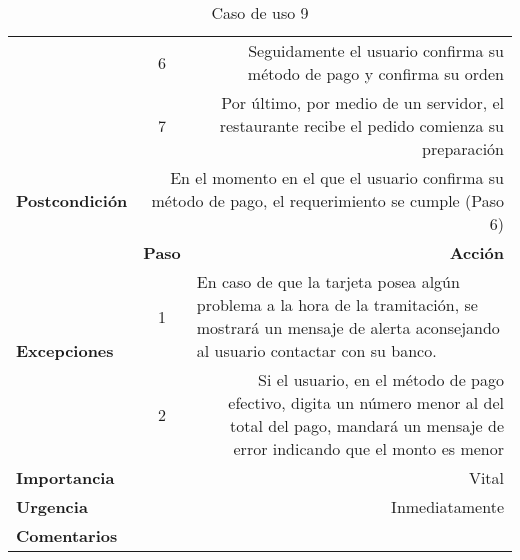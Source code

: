 \documentclass[conference]{IEEEtran}
\begin{document}
\begin{table}[H]
\begin{adjustbox}{width=0.47\textwidth}
\begin{tabular}{|p{11.215em}|r|r|}
\cmidrule{2-3}    \multicolumn{1}{|c|}{} & \multicolumn{1}{c|}{6} & \multicolumn{1}{p{32em}|}{Seguidamente el usuario confirma su método de pago y confirma su orden } \\
\cmidrule{2-3}    \multicolumn{1}{|c|}{} & \multicolumn{1}{c|}{7} & \multicolumn{1}{p{32em}|}{Por último, por medio de un servidor, el restaurante recibe el pedido comienza su preparación} \\
    \midrule
    \textbf{Postcondición} & \multicolumn{2}{p{37.355em}|}{En el momento en el que el usuario confirma su método de pago, el requerimiento se cumple (Paso 6)} \\
    \midrule
    \multirow{4}[6]{*}{\textbf{Excepciones}} & \multicolumn{1}{p{5.355em}|}{\textbf{Paso}} & \multicolumn{1}{p{32em}|}{\textbf{Acción}} \\
\cmidrule{2-3}    \multicolumn{1}{|c|}{} & \multicolumn{1}{c|}{\multirow{2}[2]{*}{1}} & \multicolumn{1}{l|}{\multirow{2}[2]{*}{En caso de que la tarjeta posea algún problema a la hora de la tramitación, se mostrará un mensaje de alerta aconsejando al usuario contactar con su banco. }} \\
    \multicolumn{1}{|c|}{} &       &  \\
\cmidrule{2-3}    \multicolumn{1}{|c|}{} & \multicolumn{1}{c|}{2} & \multicolumn{1}{p{32em}|}{Si el usuario, en el método de pago efectivo, digita un número menor al del total del pago, mandará un mensaje de error indicando que el monto es menor} \\
    \midrule
    \textbf{Importancia} & \multicolumn{2}{p{37.355em}|}{Vital} \\
    \midrule
    \textbf{Urgencia} & \multicolumn{2}{p{37.355em}|}{Inmediatamente} \\
    \midrule
    \textbf{Comentarios} & \multicolumn{2}{r|}{} \\
    \bottomrule
    \end{tabular}%
    \end{adjustbox}
    \vspace{0.3cm}
    \caption{Caso de uso 9}
  \label{tab:addlabel}%
\end{table}%
\end{document}
